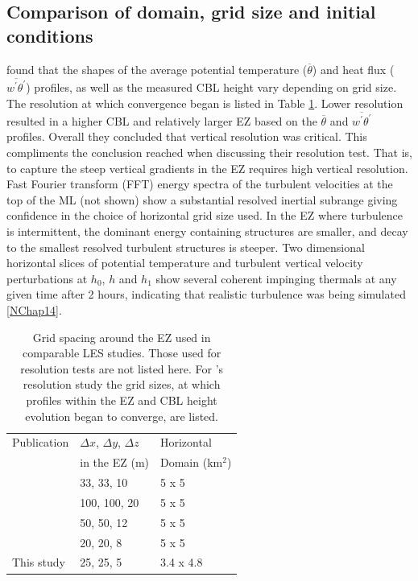 \documentclass[referee]{svjour3}
\begin{document}
\subsection{Comparison of domain, grid size and initial conditions}

\cite{SullPat} found that the shapes of the average potential temperature ($\overline{\theta}$) and heat flux ($\overline{w^{'}\theta^{'}}$) profiles, as well as the measured CBL height vary depending on grid size.  The resolution at which convergence began is listed in Table \ref{table:gridcomp}.  Lower resolution resulted in a higher CBL and relatively larger EZ based on the $\overline{\theta}$ and $\overline{w^{'}\theta^{'}}$ profiles.  Overall they concluded that vertical resolution was critical.  This compliments the conclusion \cite{BrooksFowler2} reached when discussing their resolution test.  That is, to capture the steep vertical gradients in the EZ requires high vertical resolution. \\

Fast Fourier transform (FFT) energy spectra of the turbulent velocities at the top of the ML (not shown) show a substantial resolved inertial subrange giving confidence in the choice of horizontal grid size used. In the EZ where turbulence is intermittent, the dominant energy containing structures are smaller, and decay to the smallest resolved turbulent structures is steeper. Two dimensional horizontal slices of potential temperature and turbulent vertical velocity perturbations at $h_{0}$, $h$ and $h_{1}$ show several coherent impinging thermals at any given time after 2 hours, indicating that realistic turbulence was being simulated \ref{NChap14}.\\

\begin{table}[htbp]
\caption[Comparison of Grid-Sizes used in similar Studies]{Grid spacing around the EZ used in comparable LES studies. Those used for resolution tests are not listed here.  For \cite{SullPat}'s resolution study the grid sizes, at which profiles within the EZ and CBL height evolution began to converge, are listed.}

    \begin{tabular}{p{4cm} p{2cm} p{2cm}}
Publication & $\Delta x$, $\Delta y$, $\Delta z$ & Horizontal \\
 & in the EZ (m) & Domain (km$^{2}$) \\ \hline
      \cite{SullMoengStev}& 33, 33, 10 & 5 x 5 \\ 
      \cite{FedConzMir04}& 100, 100, 20 & 5 x 5 \\ 
      \cite{BrooksFowler2}& 50, 50, 12 & 5 x 5 \\
      \cite{SullPat} &  20, 20, 8 & 5 x 5\\
      This study & 25, 25, 5 &  3.4 x 4.8\\ \hline       
    \end{tabular}
\label{table:gridcomp}   
\end{table}
\end{document}
